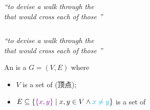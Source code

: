 
\begin{frame}{}

  \pause
  \begin{center}
    {\it ``to devise a walk through the  \\
    that would cross each of those  ''}
  \end{center}
\end{frame}

\begin{frame}{}
  \begin{columns}
  \end{columns}
\end{frame}

\begin{frame}{}
  \begin{columns}
  \end{columns}

  \pause
  \vspace{0.60cm}
  \begin{center}
    {\it ``to devise a walk through the  \\
    that would cross each of those  ''}
  \end{center}
\end{frame}

\begin{frame}{}
  \begin{definition}[Graph (图)]
    An  is a  $G = (V, E)$ where \\[6pt]
    \begin{itemize}
      \setlength{\itemsep}{5pt}
      \item $V$ is a set of  (顶点);
      \item $E \subseteq \{\textcolor{violet}{\{x, y\}} \mid x, y \in V \land \textcolor{cyan}{x \neq y}\}$
        is a set of 
    \end{itemize}
  \end{definition}

  \pause
  \vspace{0.30cm}
\end{frame}

